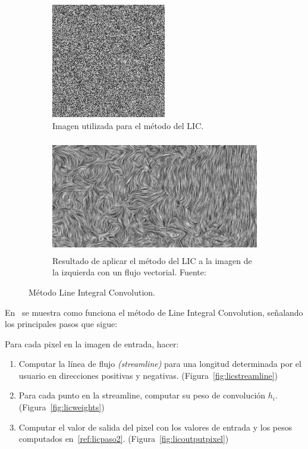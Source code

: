 \begin{figure}[!ht]
	\centering	
	\begin{subfigure}[t]{.45\textwidth}
		\includegraphics[height=5cm,width=\textwidth]{figures/licwhitenoise.png}
		\caption{Imagen utilizada para el método del LIC.}
	\end{subfigure}
	\hfill
	\begin{subfigure}[t]{.45\textwidth}
		\includegraphics[height=5cm,width=\textwidth]{figures/lic1.png}
		\caption{Resultado de aplicar el método del LIC a la imagen de la
		izquierda con un flujo vectorial. Fuente:~\cite{osti_10185520}}
	\end{subfigure}
	\caption{Método Line Integral Convolution.}
	\label{fig:lic}
\end{figure}

En~\citet{licthesis} se muestra como funciona el método de Line Integral
Convolution, señalando los principales pasos que sigue:

Para cada pixel en la imagen de entrada, hacer:
\begin{enumerate}
		\item Computar la línea de flujo \textit{(streamline)} para una longitud
				determinada por el usuario en direcciones positivas y
				negativas. (Figura~\ref{fig:licstreamline})
		\item \label{ref:licpaso2} Para cada punto en la streamline, computar su
				peso de convolución $h_i$. (Figura~\ref{fig:licweights})
		\item Computar el valor de salida del pixel con los valores de entrada y
				los pesos computados en~\ref{ref:licpaso2}.
				(Figura~\ref{fig:licoutputpixel})
\end{enumerate}

